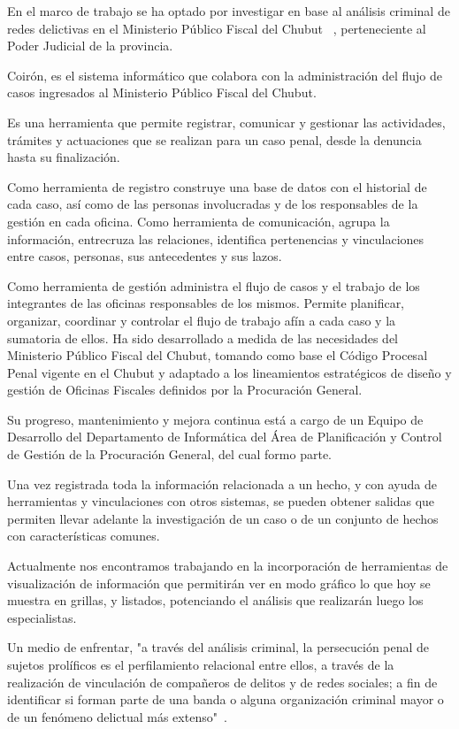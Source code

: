 En el marco de trabajo se ha optado por investigar en base al análisis criminal de redes delictivas en el Ministerio Público Fiscal del Chubut ~\cite{ref_article30}, perteneciente al Poder Judicial de la provincia.

Coirón, es el sistema informático que colabora con la administración del flujo de casos ingresados al Ministerio Público Fiscal del Chubut.

Es una herramienta que permite registrar, comunicar y gestionar las actividades, trámites y actuaciones que se realizan para un caso penal, desde la denuncia hasta su finalización.

Como herramienta de registro construye una base de datos con el historial de cada caso, así como de las personas involucradas y de los responsables de la gestión en cada oficina.
Como herramienta de comunicación, agrupa la información, entrecruza las relaciones, identifica pertenencias y vinculaciones entre casos, personas, sus antecedentes y sus lazos.

Como herramienta de gestión administra el flujo de casos y el trabajo de los integrantes de las oficinas responsables de los mismos. Permite planificar, organizar, coordinar y controlar el flujo de trabajo afín a cada caso y la sumatoria de ellos.
Ha sido desarrollado a medida de las necesidades del Ministerio Público Fiscal del Chubut, tomando como base el Código Procesal Penal vigente en el Chubut y adaptado a los lineamientos estratégicos de diseño y gestión de Oficinas Fiscales definidos por la Procuración General.

Su progreso, mantenimiento y mejora continua está a cargo de un Equipo de Desarrollo del Departamento de Informática del Área de Planificación y Control de Gestión de la Procuración General, del cual formo parte.

Una vez registrada toda la información relacionada a un hecho, y con ayuda de herramientas y vinculaciones con otros sistemas, se pueden obtener salidas que permiten llevar adelante la
investigación de un caso o de un conjunto de hechos con características comunes.

Actualmente nos encontramos trabajando en la incorporación de herramientas de visualización de información que permitirán ver en modo gráfico lo que hoy se muestra en grillas, y listados, potenciando el análisis que realizarán luego los especialistas.

Un medio de enfrentar, "a través del análisis criminal, la persecución penal de sujetos prolíficos es el perfilamiento relacional entre ellos, a través de la realización de vinculación de compañeros de delitos y de redes sociales; a fin de identificar si forman parte de una banda o alguna organización criminal mayor o de un fenómeno delictual más extenso"~\cite{ref_article31}.

